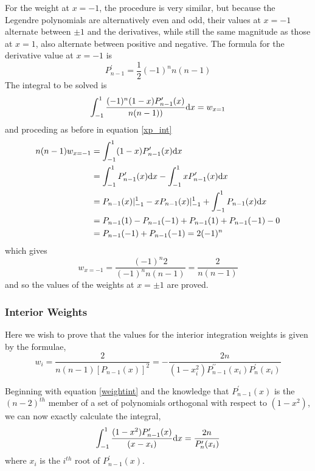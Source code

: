 For the weight at $x=-1$, the procedure is very similar, but because the Legendre
polynomials are alternatively even and odd, their values at $x=-1$ alternate 
between $\pm1$ and the derivatives, while still the same magnitude as those
at $x=1$, also alternate between positive and negative.  
The formula for the derivative value at $x=-1$ is 
\begin{equation}
\label{w_xn_1}
P^\prime_{n-1}=\frac{1}{2}(-1)^nn(n-1)
\end{equation}
The integral to be solved is
\begin{equation}
\label{w_xn_2}
\int_{-1}^{1} \frac{(-1)^n(1-x)P^\prime_{n-1}(x)}{n(n-1))}{\rm d}x = w_{x=1}
\end{equation}
and proceding as before in equation \ref{xp_int}
\begin{align}
n(n-1)w_{x=-1} &= \int_{-1}^{1} (1-x)P^\prime_{n-1}(x){\rm d}x \nonumber \\
&= \int_{-1}^{1} P^\prime_{n-1}(x){\rm d}x - \int_{-1}^{1} xP^\prime_{n-1}(x){\rm d}x \nonumber \\
&= P_{n-1}(x)\vert^1_{-1} - xP_{n-1}(x) \vert^1_{-1} + \int_{-1}^{1} P_{n-1}(x){\rm d}x \nonumber \\
&= P_{n-1}(1)-P_{n-1}(-1)+P_{n-1}(1)+P_{n-1}(-1) - 0 \nonumber \\
&= P_{n-1}(-1)+P_{n-1}(-1) = 2(-1)^n
\label{xn_int}
\end{align}
which gives
\begin{equation}
w_{x=-1}=\frac{(-1)^n2}{(-1)^nn(n-1)} = \frac{2}{n(n-1)}
\end{equation}
and so the values of the weights at $x=\pm1$ are proved.


\subsubsection{Interior Weights}
Here we wish to prove that the values for the interior integration weights is given 
by the formulae, 
\begin{equation}
\label{weightform2}
w_i=\frac{2}{n(n-1)[P_{n-1}(x)]^2} = -\frac{2n}{(1-x_i^2)P_{n-1}^{\prime\prime}(x_i)P_n^\prime(x_i)}
\end{equation}

Beginning with equation \ref{weightint} and the knowledge that $P_{n-1}^\prime(x)$ is
the $(n-2)^{th}$ member of a set of polynomials orthogonal with respect to $(1-x^2)$, 
we can now exactly calculate the integral, 
\begin{equation}
\label{pint}
\int_{-1}^{1} \frac{(1-x^2)P^\prime_{n-1}(x)}{(x-x_i)}{\rm d}x = \frac{2n}{P^\prime_n(x_i)} \nonumber
\end{equation}
where $x_i$ is the $i^{th}$ root of $P^\prime_{n-1}(x)$.

